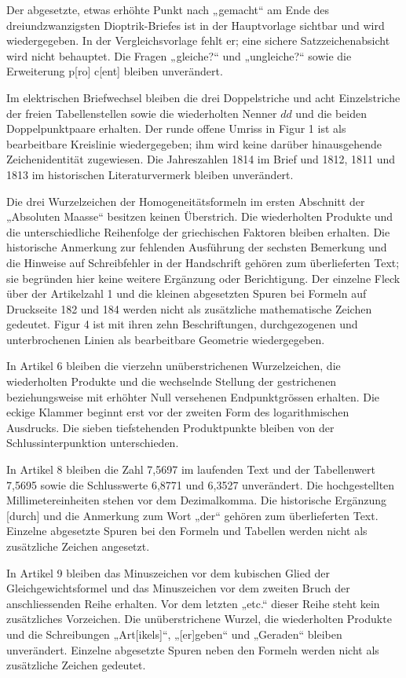 Der abgesetzte, etwas erhöhte Punkt nach „gemacht“ am Ende des dreiundzwanzigsten Dioptrik-Briefes ist in der Hauptvorlage sichtbar und wird wiedergegeben. In der Vergleichsvorlage fehlt er; eine sichere Satzzeichenabsicht wird nicht behauptet. Die Fragen „gleiche?“ und „ungleiche?“ sowie die Erweiterung p[ro] c[ent] bleiben unverändert.

Im elektrischen Briefwechsel bleiben die drei Doppelstriche und acht Einzelstriche der freien Tabellenstellen sowie die wiederholten Nenner $dd$ und die beiden Doppelpunktpaare erhalten. Der runde offene Umriss in Figur 1 ist als bearbeitbare Kreislinie wiedergegeben; ihm wird keine darüber hinausgehende Zeichenidentität zugewiesen. Die Jahreszahlen 1814 im Brief und 1812, 1811 und 1813 im historischen Literaturvermerk bleiben unverändert.

Die drei Wurzelzeichen der Homogeneitätsformeln im ersten Abschnitt der „Absoluten Maasse“ besitzen keinen Überstrich. Die wiederholten Produkte und die unterschiedliche Reihenfolge der griechischen Faktoren bleiben erhalten. Die historische Anmerkung zur fehlenden Ausführung der sechsten Bemerkung und die Hinweise auf Schreibfehler in der Handschrift gehören zum überlieferten Text; sie begründen hier keine weitere Ergänzung oder Berichtigung. Der einzelne Fleck über der Artikelzahl 1 und die kleinen abgesetzten Spuren bei Formeln auf Druckseite 182 und 184 werden nicht als zusätzliche mathematische Zeichen gedeutet. Figur 4 ist mit ihren zehn Beschriftungen, durchgezogenen und unterbrochenen Linien als bearbeitbare Geometrie wiedergegeben.

In Artikel 6 bleiben die vierzehn unüberstrichenen Wurzelzeichen, die wiederholten Produkte und die wechselnde Stellung der gestrichenen beziehungsweise mit erhöhter Null versehenen Endpunktgrössen erhalten. Die eckige Klammer beginnt erst vor der zweiten Form des logarithmischen Ausdrucks. Die sieben tiefstehenden Produktpunkte bleiben von der Schlussinterpunktion unterschieden.

In Artikel 8 bleiben die Zahl 7,5697 im laufenden Text und der Tabellenwert 7,5695 sowie die Schlusswerte 6,8771 und 6,3527 unverändert. Die hochgestellten Millimetereinheiten stehen vor dem Dezimalkomma. Die historische Ergänzung [durch] und die Anmerkung zum Wort „der“ gehören zum überlieferten Text. Einzelne abgesetzte Spuren bei den Formeln und Tabellen werden nicht als zusätzliche Zeichen angesetzt.

In Artikel 9 bleiben das Minuszeichen vor dem kubischen Glied der Gleichgewichtsformel und das Minuszeichen vor dem zweiten Bruch der anschliessenden Reihe erhalten. Vor dem letzten „etc.“ dieser Reihe steht kein zusätzliches Vorzeichen. Die unüberstrichene Wurzel, die wiederholten Produkte und die Schreibungen „Art[ikels]“, „[er]geben“ und „Geraden“ bleiben unverändert. Einzelne abgesetzte Spuren neben den Formeln werden nicht als zusätzliche Zeichen gedeutet.

